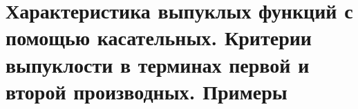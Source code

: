 \section{Характеристика выпуклых функций с помощью касательных. Критерии выпуклости в терминах первой и второй производных. Примеры}